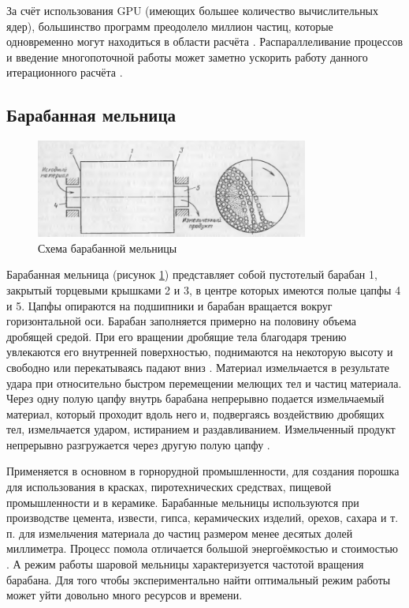 \documentclass[utf8x, 14pt, oneside, a4paper]{article}
\begin{document}
За счёт использования GPU (имеющих большее количество вычислительных ядер), большинство программ преодолело миллион частиц, которые одновременно могут находиться в области расчёта \cite{another_hard}. 
Распараллеливание процессов и введение многопоточной работы может заметно ускорить работу данного итерационного расчёта \cite{priklad}.

\subsection*{Барабанная мельница}
\label{mill_theory}

\begin{figure}[H]
	\centering
	\includegraphics[width=0.8\textwidth]{baraban_shema}
	\caption{Схема барабанной мельницы}
	\label{pic:baraban_shema}
\end{figure} 

Барабанная мельница (рисунок \ref{pic:baraban_shema}) представляет собой пустотелый барабан 1, закрытый торцевыми крышками 2 и 3, в центре которых имеются полые цапфы 4 и 5. 
Цапфы опираются на подшипники и барабан вращается вокруг горизонтальной оси.
Барабан заполняется примерно на половину объема дробящей средой.
При его вращении дробящие тела  благодаря трению увлекаются его внутренней поверхностью, поднимаются на некоторую высоту и свободно или перекатываясь падают вниз \cite{china_mill}.
Материал измельчается в результате удара при относительно быстром перемещении мелющих тел и частиц материала.
Через одну полую цапфу внутрь барабана непрерывно подается измельчаемый материал, который проходит вдоль него и, подвергаясь воздействию дробящих тел, измельчается ударом, истиранием и раздавливанием.
Измельченный продукт непрерывно разгружается через другую полую цапфу \cite{mill_book}.

Применяется в основном в горнорудной промышленности, для создания порошка для использования в красках, пиротехнических средствах, пищевой промышленности и в керамике. 
Барабанные мельницы используются при производстве цемента, извести, гипса, керамических изделий, орехов, сахара и т. п. для измельчения материала до частиц размером менее десятых долей миллиметра. 
Процесс помола отличается большой энергоёмкостью и стоимостью \cite{mill_smth}. 
А режим работы шаровой мельницы характеризуется частотой вращения барабана. 
Для того чтобы экспериментально найти оптимальный режим работы может уйти довольно много ресурсов и времени.
\end{document}

